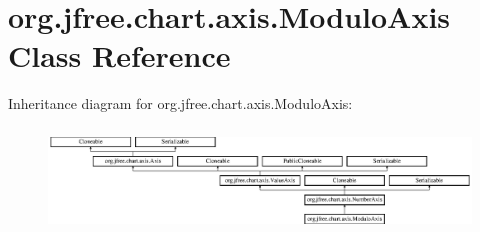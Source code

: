 \hypertarget{classorg_1_1jfree_1_1chart_1_1axis_1_1_modulo_axis}{}\section{org.\+jfree.\+chart.\+axis.\+Modulo\+Axis Class Reference}
\label{classorg_1_1jfree_1_1chart_1_1axis_1_1_modulo_axis}
Inheritance diagram for org.\+jfree.\+chart.\+axis.\+Modulo\+Axis\+:\begin{figure}[H]
\begin{center}
\leavevmode
\includegraphics[height=2.800000cm]{classorg_1_1jfree_1_1chart_1_1axis_1_1_modulo_axis}
\end{center}
\end{figure}
